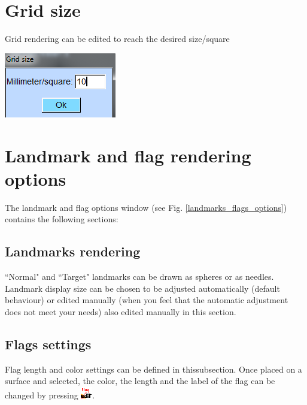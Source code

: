 \section{Grid size}


\noindent
\begin{minipage}{0.55\textwidth}
Grid rendering can be edited to reach the desired size/square
\end{minipage}  
 \begin{minipage}{0.45\textwidth}\centering
\includegraphics[scale=0.5]{images/Viewing_options/Grid_size.png}

 \end{minipage} 
\noindent





\section{Landmark and flag rendering options}
The landmark and flag options window (see Fig. \ref{landmarks_flags_options}) contains the following sections:

\subsection{Landmarks rendering}
``Normal" and ``Target" landmarks can be drawn as spheres or as needles. Landmark display size can be chosen to be adjusted automatically (default behaviour) or edited manually (when you feel that the automatic adjustment does not meet your needs) also edited manually in this section.



\subsection{Flags settings}
Flag length and color settings can be defined in thissubsection. Once placed on a surface and selected, the color, the length and the label of the flag can be changed by pressing
\includegraphics[scale=0.7]{images/pixmap/Flag02.png}.


